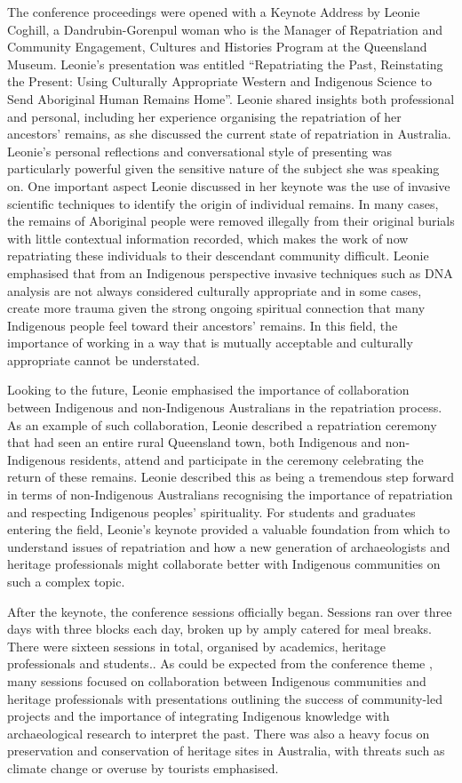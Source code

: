 The conference proceedings were opened with a Keynote Address by Leonie Coghill, a Dandrubin-Gorenpul woman who is the Manager of Repatriation and Community Engagement, Cultures and Histories Program at the Queensland Museum. Leonie’s presentation was entitled “Repatriating the Past, Reinstating the Present: Using Culturally Appropriate Western and Indigenous Science to Send Aboriginal Human Remains Home”.  Leonie shared insights both professional and personal, including her experience organising the repatriation of her ancestors’ remains, as she discussed the current state of repatriation in Australia. Leonie’s personal reflections and conversational style of presenting was particularly powerful given the sensitive nature of the subject she was speaking on. One important aspect Leonie discussed in her keynote was the use of invasive scientific techniques to identify the origin of individual remains. In many cases, the remains of Aboriginal people were removed illegally from their original burials with little contextual information recorded, which makes the work of now repatriating these individuals to their descendant community difficult. Leonie emphasised that from an Indigenous perspective invasive techniques such as DNA analysis are not always considered culturally appropriate and in some cases, create more trauma given the strong ongoing spiritual connection that many Indigenous people feel toward their ancestors’ remains. In this field, the importance of working in a way that is mutually acceptable and culturally appropriate cannot be understated.

Looking to the future, Leonie emphasised the importance of collaboration between Indigenous and non-Indigenous Australians in the repatriation process. As an example of such collaboration, Leonie described a repatriation ceremony that had seen an entire rural Queensland town, both Indigenous and non-Indigenous residents, attend and participate in the ceremony celebrating the return of these remains. Leonie described this as being a tremendous step forward in terms of non-Indigenous Australians recognising the importance of repatriation and respecting Indigenous peoples’ spirituality. For students and graduates entering the field, Leonie’s keynote provided a valuable foundation from which to understand issues of repatriation and how a new generation of archaeologists and heritage professionals might collaborate better with Indigenous communities on such a complex topic. 

After the keynote, the conference sessions officially began. Sessions ran over three days with three blocks each day, broken up by amply catered for meal breaks. There were sixteen sessions in total, organised by academics, heritage professionals and students.. As could be expected from the conference theme , many sessions focused on collaboration between Indigenous communities and heritage professionals with presentations outlining the success of community-led projects and the importance of integrating Indigenous knowledge with archaeological research to interpret the past. There was also a heavy focus on preservation and conservation of heritage sites in Australia, with threats such as climate change or overuse by tourists emphasised. 

